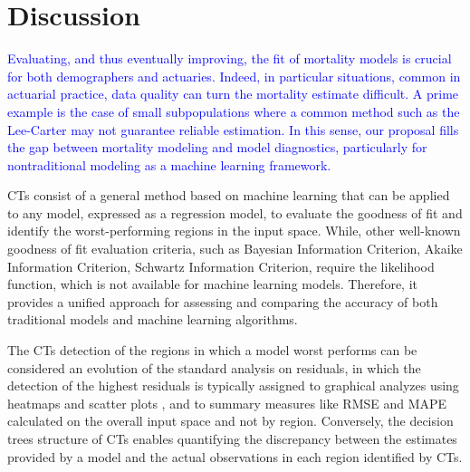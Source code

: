 \documentclass[fleqn,10pt]{wlscirep}
\begin{document}

\section*{Discussion}
\textcolor{blue}{Evaluating, and thus eventually improving, the fit of mortality models is crucial for both demographers and actuaries. 
Indeed, in particular situations, common in actuarial practice, data quality can turn the mortality estimate difficult. 
A prime example is the case of small subpopulations where a common method such as the Lee-Carter may not guarantee reliable estimation. In this sense, our proposal fills the gap between mortality modeling and model diagnostics, particularly for nontraditional modeling as a machine learning framework.}

CTs consist of a general method based on machine learning that can be applied to any model, expressed as a regression model, to evaluate the goodness of fit and identify the worst-performing regions in the input space. While, other well-known goodness of fit evaluation criteria, such as Bayesian Information Criterion, Akaike Information Criterion, Schwartz Information Criterion, require the likelihood function, which is not available for machine learning models. Therefore, it provides a unified approach for assessing and comparing the accuracy of both traditional models and machine learning algorithms.

The CTs detection of the regions in which a model worst performs can be considered an evolution of the standard analysis on residuals, in which the detection of the highest residuals is typically assigned to graphical analyzes using heatmaps and scatter plots \cite{CBD09,Villegas2018}, and to summary measures like RMSE and MAPE calculated on the overall input space and not by region.
Conversely, the decision trees structure of CTs enables quantifying the discrepancy between the estimates provided by a model and the actual observations in each region identified by CTs.
\end{document}
